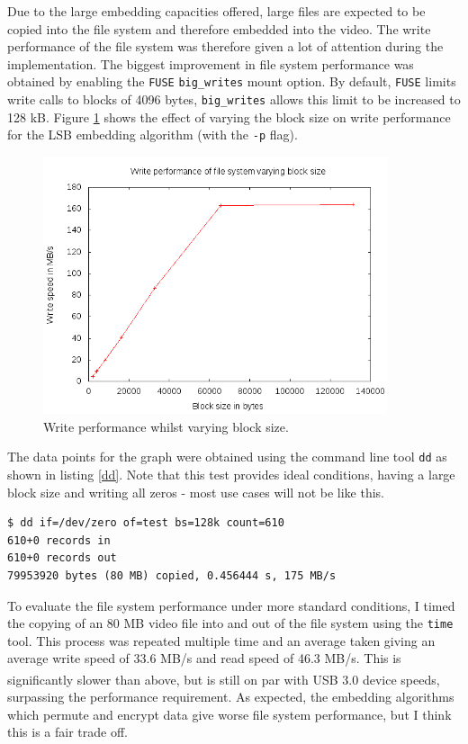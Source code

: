 \documentclass[paper=a4, fontsize=11pt,twoside]{scrartcl}
\numberwithin{table}{section}
\numberwithin{figure}{section}
\numberwithin{algorithm}{section}
\begin{document}
Due to the large embedding capacities offered, large files are expected to be copied into the file system and therefore embedded into the video. The write performance of the file system was therefore given a lot of attention during the implementation. The biggest improvement in file system performance was obtained by enabling the \texttt{FUSE} \texttt{big\_writes} mount option. By default, \texttt{FUSE} limits write calls to blocks of 4096 bytes, \texttt{big\_writes} allows this limit to be increased to 128 kB. Figure \ref{writeper} shows the effect of varying the block size on write performance for the LSB embedding algorithm (with the \texttt{-p} flag).

\begin{figure}[!tbh]
\centerline{\includegraphics[width=0.9\textwidth]{images/writeper.png}}
\caption{Write performance whilst varying block size.}
\label{writeper}
\end{figure}

The data points for the graph were obtained using the command line tool \texttt{dd} as shown in listing \ref{dd}. Note that this test provides ideal conditions, having a large block size and writing all zeros - most use cases will not be like this.

\begin{lstlisting}[caption={Testing the file system performance using \texttt{dd}.}, frame=single, label=dd, float, floatplacement=!htHb]
$ dd if=/dev/zero of=test bs=128k count=610
610+0 records in
610+0 records out
79953920 bytes (80 MB) copied, 0.456444 s, 175 MB/s
\end{lstlisting}

To evaluate the file system performance under more standard conditions, I timed the copying of an 80 MB video file into and out of the file system using the \texttt{time} tool. This process was repeated multiple time and an average taken giving an average write speed of 33.6 MB/s and read speed of 46.3 MB/s. This is significantly slower than above, but is still on par with USB 3.0 device speeds\textsuperscript{\cite{usb3}}, surpassing the performance requirement. As expected, the embedding algorithms which permute and encrypt data give worse file system performance, but I think this is a fair trade off.
\end{document}
